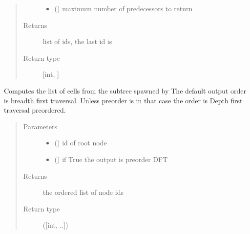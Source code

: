 \documentclass[letterpaper,10pt,english]{sphinxmanual}
\begin{document}
\begin{fulllineitems}
\begin{fulllineitems}
\begin{quote}
\begin{description}
\begin{itemize}
\item {} 
 () \textendash{} maximum number of predecessors to return

\end{itemize}

\item[{Returns}] \leavevmode
list of ids, the last id is 

\item[{Return type}] \leavevmode
{[}int, {]}

\end{description}\end{quote}

\end{fulllineitems}


\begin{fulllineitems}
\label{\detokenize{index:LineageTree.lineageTree.get_sub_tree}}
Computes the list of cells from the subtree spawned by 
The default output order is breadth first traversal.
Unless preorder is  in that case the order is
Depth first traversal preordered.
\begin{quote}\begin{description}
\item[{Parameters}] \leavevmode\begin{itemize}
\item {} 
 () \textendash{} id of root node

\item {} 
 () \textendash{} if True the output is preorder DFT

\end{itemize}

\item[{Returns}] \leavevmode
the ordered list of node ids

\item[{Return type}] \leavevmode
({[}int, ..{]})

\end{description}\end{quote}


\end{fulllineitems}
\end{fulllineitems}
\end{document}
